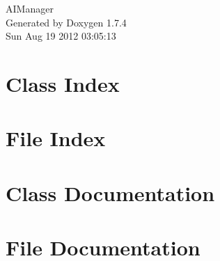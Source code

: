 \documentclass[a4paper]{book}
\begin{document}
\hypersetup{pageanchor=false}
\begin{titlepage}
\vspace*{7cm}
\begin{center}
{\Large AIManager }\\
\vspace*{1cm}
{\large Generated by Doxygen 1.7.4}\\
\vspace*{0.5cm}
{\small Sun Aug 19 2012 03:05:13}\\
\end{center}
\end{titlepage}
\clearemptydoublepage
{}
\tableofcontents
\clearemptydoublepage
{}
\hypersetup{pageanchor=true}
\chapter{Class Index}

\chapter{File Index}

\chapter{Class Documentation}




\chapter{File Documentation}







\printindex
\end{document}
